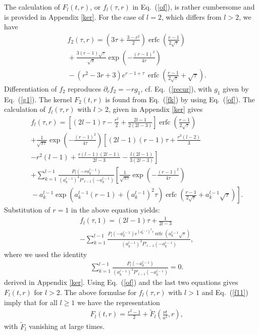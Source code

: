 \documentclass[aps,prx,twocolumn,amsmath,amssymb,amsfonts]{revtex4-2}
\DeclareMathOperator\erfc{erfc}
\begin{document}
The calculation of $F_l(t, r)$, or $f_l(\tau, r)$ in Eq.~(\ref{of}), is rather cumbersome and is provided in Appendix \ref{ker}. For the case of $l=2$, which differs from $l>2$, we have
\begin{eqnarray}&&\!\!\!\!\!\!\!
f_2(\tau, r)\!=\!
\left(3\tau+\frac{3-r^2}{2}\right)\erfc\left(\frac{r-1}{2\sqrt{\tau}}\right)
\label{fk}\\&&\!\!\!\!\!\!\!
+\frac{3(r-1)\sqrt{\tau}}{\sqrt{\pi}}\exp\left(-\frac{(r-1)^2}{4\tau}\right)
\nonumber\\&&\!\!\!\!\!\!\!
-(r^2-3r+3) e^{r-1+\tau}\, \erfc\left(\frac{r-1}{2\sqrt{\tau}}+\sqrt{\tau}\right).\nonumber
\end{eqnarray}
Differentiation of $f_2$ reproduces $\partial_r f_2=-r g_1$, cf. Eq.~(\ref{recur}), with $g_1$ given by Eq.~(\ref{g1}).
The kernel $F_2(t, r)$ is found from Eq.~(\ref{fk}) by using Eq.~(\ref{of}). The calculation of $f_l(\tau, r)$ with $l>2$, given in Appendix \ref{ker} gives
\begin{eqnarray}&&
f_l(\tau, r)\!=\!
\left[(2l\!-\!1)\tau\!-\!\frac{r^2}{2}\!+\!\frac{2l\!-\!1}{2(2l\!-\!3)}\right]\erfc\left(\frac{r\!-\!1}{2\sqrt{\tau}}\right)
\label{fkl}\\&&
+\frac{1}{\sqrt{\pi\tau}}\exp\left(-\frac{(r-1)^2}{4\tau}\right)\left[(2l\!-\!1)(r-1)\tau+\frac{r^3(l\!-\!2)}{3}
\right.\nonumber\\&&\left. -r^2(l\!-\!1)+\frac{r(l\!-\!1)(2l\!-\!1)}{2l\!-\!3}
-\frac{l(2l\!-\!1)}{3(2l\!-\!3)}\right]
\nonumber\\&&
+\!\sum_{k=1}^{l-1}\!\!\frac{P_{l}(-r a_k^{l-1})}{\left(a_k^{l-1}\right)^4P'_{l-1}(-a_k^{l-1})}
\left[\frac{1}{\sqrt{\pi\tau}}\exp\left(-\frac{(r-1)^2}{4\tau}\right)
\right.\nonumber\\&&\left.
\!-\!a_k^{l-1}\exp\left(a_k^{l-1}(r\!-\!1)\!+\!(a_k^{l-1})^2\tau\right)
\erfc\left(\frac{r\!-\!1}{2\sqrt{\tau}}\!+\!a_k^{l-1}\sqrt{\tau}\right)
\right].\nonumber
\end{eqnarray}
Substitution of $r=1$ in the above equation yields:
\begin{eqnarray}&&
f_l(\tau, 1)=
(2l-1)\tau+\frac{1}{2l-3}
\label{fl1}\\&&
-\sum_{k=1}^{l-1}\frac{P_{l}(-a_k^{l-1}) e^{(a_k^{l-1})^2\tau}
\erfc\left(a_k^{l-1}\sqrt{\tau}\right)}{\left(a_k^{l-1}\right)^3P'_{l-1}(-a_k^{l-1})}
,\nonumber
\end{eqnarray}
where we used the identity
\begin{eqnarray}&&
\sum_{k=1}^{l-1}\frac{P_{l}(-a_k^{l-1})}{\left(a_k^{l-1}\right)^4P'_{l-1}(-a_k^{l-1})}\!=\!0. \label{sumrule}
\end{eqnarray}
derived in Appendix \ref{ker}. Using Eq.~(\ref{of}) and the last two equations gives $F_l(t, r)$ for $l>2$. The above formulae for $f_l(\tau, r)$ with $l>1$ and Eq.~(\ref{f11}) imply that for all $l\geq 1$ we have the representation
\begin{eqnarray}&&\!\!\!\!\!\!\!
F_l(t, r)=\frac{r^2\!-\!1}{2}+{\tilde F}_l\left(\frac{\nu t}{a^2}, r\right), \label{isl}
\end{eqnarray}
with ${\tilde F}_l$ vanishing at large times.
\end{document}
